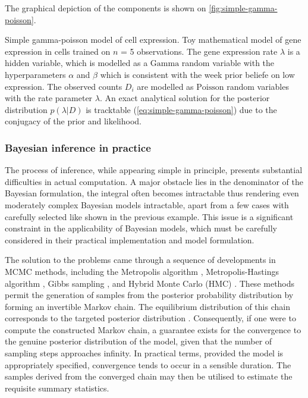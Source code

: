 The graphical depiction of the components is shown on \cref{fig:simple-gamma-poisson}.

    {Simple gamma-poisson model of cell expression.}
    {Toy mathematical model of gene expression in cells trained on $n$ = 5 observations. The gene expression rate $\lambda$ is a hidden variable, which is modelled as a $\text{Gamma}$ random variable with the hyperparameters $\alpha$ and $\beta$ which is consistent with the week prior beliefe on low expression. The observed counts $D_i$ are modelled as $\text{Poisson}$ random variables with the rate parameter $\lambda$. An exact analytical solution for the posterior distribution $p(\lambda|D)$ is tracktable (\cref{eq:simple-gamma-poisson}) due to the conjugacy of the prior and likelihood.}

\subsubsection*{Bayesian inference in practice}
The process of inference, while appearing simple in principle, presents substantial difficulties in actual computation. A major obstacle lies in the denominator of the Bayesian formulation, the integral often becomes intractable  thus rendering even moderately complex Bayesian models intractable, apart from a few cases with carefully selected  like shown in the previous example. This issue is a significant constraint in the applicability of Bayesian models, which must be carefully considered in their practical implementation and model formulation.

The solution to the problems came through a sequence of developments in \ac{MCMC} methods, including the Metropolis algorithm \parencite{Rosenbluth1953-gu}, Metropolis-Hastings algorithm \parencite{Hastings1970-mb}, Gibbs sampling \parencite{Geman1984-nk}, and Hybrid Monte Carlo (HMC) \parencite{Duane1987-gu}. These methods permit the generation of samples from the posterior probability distribution by forming an invertible Markov chain. The equilibrium distribution of this chain corresponds to the targeted posterior distribution \parencite{Roberts2004-op}. Consequently, if one were to compute the constructed Markov chain, a guarantee exists for the convergence to the genuine posterior distribution of the model, given that the number of sampling steps approaches infinity. In practical terms, provided the model is appropriately specified, convergence tends to occur in a sensible duration. The samples derived from the converged chain may then be utilised to estimate the requisite summary statistics. 

